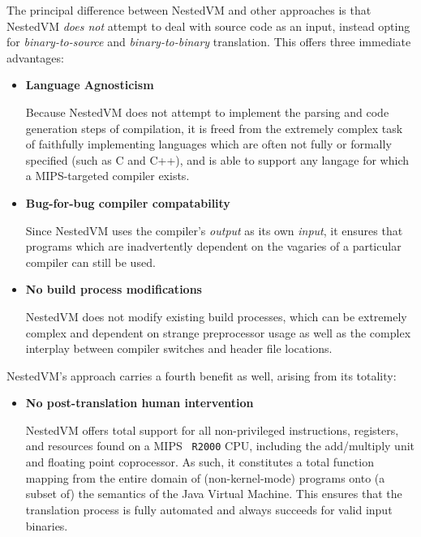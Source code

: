 \documentclass{acmconf}
\begin{document}
The principal difference between NestedVM and other approaches is that
NestedVM {\it does not} attempt to deal with source code as an input,
instead opting for {\it binary-to-source} and {\it binary-to-binary}
translation.  This offers three immediate advantages:

\begin{itemize}
\item {\bf Language Agnosticism}

      Because NestedVM does not attempt to implement the parsing and
      code generation steps of compilation, it is freed from the
      extremely complex task of faithfully implementing languages
      which are often not fully or formally specified (such as C and
      C++), and is able to support any langage for which a
      MIPS-targeted compiler exists.

\item {\bf Bug-for-bug compiler compatability}

      Since NestedVM uses the compiler's {\it output} as its own {\it
      input}, it ensures that programs which are inadvertently
      dependent on the vagaries of a particular compiler can still be
      used.

\item {\bf No build process modifications}

      NestedVM does not modify existing build processes, which can be
      extremely complex and dependent on strange preprocessor usage as
      well as the complex interplay between compiler switches and
      header file locations.

\end{itemize}

NestedVM's approach carries a fourth benefit as well, arising from its
totality:

\begin{itemize}
\item {\bf No post-translation human intervention}

      NestedVM offers total support for all non-privileged
      instructions, registers, and resources found on a MIPS {\tt
      R2000} CPU, including the add/multiply unit and floating point
      coprocessor.  As such, it constitutes a total function mapping
      from the entire domain of (non-kernel-mode) programs onto (a
      subset of) the semantics of the Java Virtual Machine.  This
      ensures that the translation process is fully automated and
      always succeeds for valid input binaries.
\end{itemize}
\end{document}
